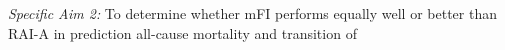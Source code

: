 \emph{Specific Aim 2:} To determine whether mFI performs equally well or better than RAI-A in prediction all-cause mortality and transition of 